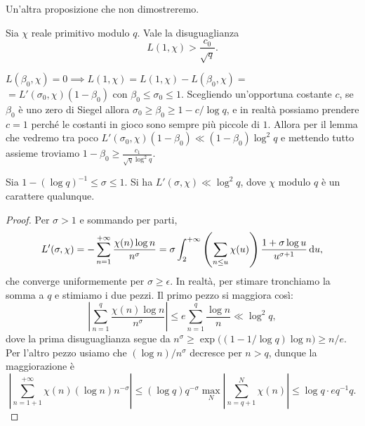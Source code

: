 Un'altra proposizione che non dimostreremo.

\begin{prop}
  Sia $\chi$ reale primitivo modulo $q$. Vale la disuguaglianza
  $$L(1,\chi)>\frac{c_0}{\sqrt{q}}.$$
\end{prop}

\begin{oss}
  $L(\beta_0,\chi)=0 \implies L(1,\chi)=L(1,\chi)-L(\beta_0,\chi)=$\\
  $=L'(\sigma_0,\chi)(1-\beta_0)$ con $\beta_0 \le \sigma_0 \le 1$. Scegliendo un'opportuna costante $c$, se $\beta_0$ è uno zero di Siegel allora $\sigma_0 \ge \beta_0 \ge 1-c/\log{q}$, e in realtà possiamo prendere $c=1$ perché le costanti in gioco sono sempre più piccole di $1$.
  Allora per il lemma che vedremo tra poco $L'(\sigma_0,\chi)(1-\beta_0) \ll (1-\beta_0)\log^2{q}$ e mettendo tutto assieme troviamo $1-\beta_0 \ge \frac{c_1}{\sqrt{q}\log^2{q}}$.
\end{oss}

\begin{lm}
  Sia $1-(\log{q})^{-1} \le \sigma \le 1$. Si ha $L'(\sigma,\chi) \ll \log^2{q}$, dove $\chi$ modulo $q$ è un carattere qualunque.
\end{lm}

\begin{proof}
  Per $\sigma>1$ e sommando per parti,
  $$L'(\sigma,\chi)=-\sum_{n=1}^{+\infty} \frac{\chi(n)\log{n}}{n^\sigma}=\sigma\int_2^{+\infty} \left(\sum_{n \le u} \chi(u)\right) \frac{1+\sigma\log{u}}{u^{\sigma+1}}\mathop{}\!\mathrm{d} u,$$
  che converge uniformemente per $\sigma \ge \epsilon$.
  In realtà, per stimare tronchiamo la somma a $q$ e stimiamo i due pezzi. Il primo pezzo si maggiora così:
  $$\left| \sum_{n=1}^q \frac{\chi(n)\log{n}}{n^{\sigma}}\right| \le e\sum_{n=1}^q \frac{\log{n}}{n} \ll \log^2{q},$$
  dove la prima disuguaglianza segue da $n^\sigma \ge \exp\big((1-1/\log{q})\log{n}\big) \ge n/e$. Per l'altro pezzo usiamo che $(\log{n})/n^{\sigma}$ decresce per $n>q$, dunque la maggiorazione è
  $$\left|\sum_{n=1+1}^{+\infty} \chi(n)(\log{n})n^{-\sigma}\right| \le (\log{q})q^{-\sigma}\max_N \left|\sum_{n=q+1}^N \chi(n)\right| \le \log{q}\cdot eq^{-1}q.$$
\end{proof}
